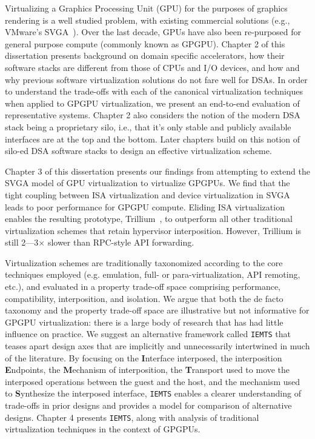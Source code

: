 Virtualizing a Graphics Processing Unit (GPU) for the purposes of graphics
rendering is a well studied problem, with existing commercial solutions (e.g.,
VMware’s SVGA~\cite{dowty2009gpu}). Over the last decade, GPUs have also been
re-purposed for general purpose compute (commonly known as GPGPU).
Chapter 2 of this dissertation presents background on domain specific
accelerators, how their software stacks are different from those of CPUs and
I/O devices, and how and why previous software virtualization solutions do not
fare well for DSAs. In order to understand the trade-offs with each of the
canonical virtualization techniques when applied to GPGPU virtualization, we
present an end-to-end evaluation of representative systems. Chapter 2 also
considers the notion of the modern DSA stack being a proprietary silo, i.e.,
that it's only stable and publicly available interfaces are at the top and the
bottom. Later chapters build on this notion of silo-ed DSA software stacks to
design an effective virtualization scheme.

Chapter 3 of this dissertation presents our findings from attempting to extend
the SVGA model of GPU virtualization to virtualize GPGPUs. We find that the
tight coupling between ISA virtualization and device  virtualization in SVGA
leads to poor performance for GPGPU compute. Eliding ISA virtualization
enables the resulting prototype, Trillium~\cite{trillium}, to outperform all
other traditional virtualization schemes that retain hypervisor interposition.
However, Trillium is still 2---3$\times$ slower than RPC-style API forwarding.

Virtualization schemes are traditionally taxonomized according to the core
techniques employed (e.g. emulation, full- or para-virtualization, API
remoting, etc.), and evaluated in a property trade-off space comprising
performance, compatibility, interposition, and isolation. We argue that both
the de facto taxonomy and the property trade-off space are illustrative but
not informative for GPGPU virtualization: there is a large body of research
that has had little influence on practice. We suggest an alternative framework
called \texttt{IEMTS} that teases apart design axes that are implicitly and
unnecessarily intertwined in much of the literature. By focusing on the
\textbf{I}nterface interposed, the interposition \textbf{E}ndpoints, the
\textbf{M}echanism of interposition, the \textbf{T}ransport used to move the
interposed operations between the guest and the host, and the mechanism used
to \textbf{S}ynthesize the interposed interface, \texttt{IEMTS} enables a
clearer understanding of trade-offs in prior designs and provides a model for
comparison of alternative designs. Chapter 4 presents \texttt{IEMTS}, along
with analysis of traditional virtualization techniques in the context of
GPGPUs.

